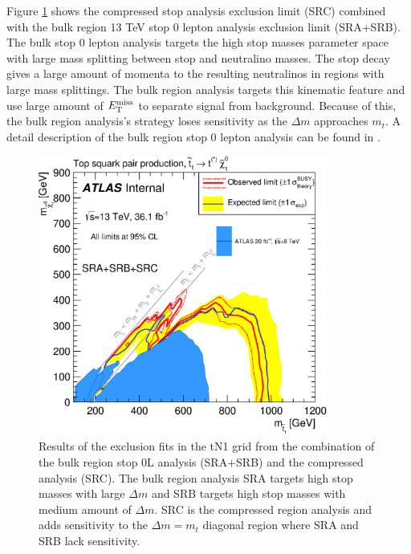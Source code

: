\indent Figure \ref{figure.exclusion.SRABC} shows the compressed stop analysis exclusion limit (SRC) combined with the bulk region 13 TeV stop 0 lepton analysis exclusion limit (SRA+SRB).  The bulk stop 0 lepton analysis targets the high stop masses parameter space with large mass splitting between stop and neutralino masses.  The stop decay gives a large amount of momenta to the resulting neutralinos in regions with large mass splittings.  The bulk region analysis targets this kinematic feature and use large amount of $E_{\mathrm{T}}^{\mathrm{miss}}$ to separate signal from background.   Because of this, the bulk region analysis's strategy loses sensitivity as the $\Delta m$ approaches $m_{t}$.  A detail description of the bulk region stop 0 lepton analysis can be found in \cite{stop0Lmoriond}.  \\

\begin{figure}[htbp]
	\begin{center}
		\includegraphics[width=0.85\textwidth]{figures/fit/atlascls_m0m12_wband1_showcms0_StopZL2016_SRABC_Tt_directTTplusbWN_all_Output_fixSigXSecNominal_hypotest__1_harvest_list.eps}
		\caption{Results of the exclusion fits in the tN1 grid from the combination of the bulk region stop 0L analysis (SRA+SRB) and the compressed analysis (SRC). The bulk region analysis SRA targets high stop masses with large $\Delta m$ and SRB targets high stop masses with medium amount of $\Delta m$.  SRC is the compressed region analysis and adds sensitivity to the $\Delta m = m_{t}$ diagonal region where SRA and SRB lack sensitivity. }
		\label{figure.exclusion.SRABC}
	\end{center}
\end{figure}


